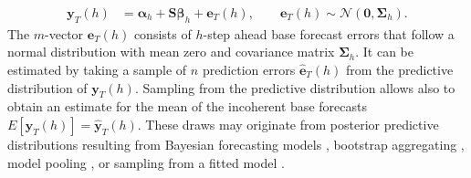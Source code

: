 \documentclass[a4paper,fleqn,11pt]{article}
\begin{document}
\begin{align}
\label{eq:meas1}
\mathbf{y}_{T}(h) &  = \boldsymbol{\alpha}_h + \textbf{S} \boldsymbol{\beta}_h + \mathbf{e}_{T}(h), \qquad \mathbf{e}_{T}(h) \sim \mathcal{N}(\textbf{0}, \boldsymbol{\Sigma}_h).
\end{align}
The $m$-vector $\mathbf{e}_{T}(h)$ consists of $h$-step ahead base forecast errors that follow a normal distribution with mean zero and covariance matrix $\boldsymbol{\Sigma}_h$. It can be estimated by taking a sample of $n$ prediction errors $\mathbf{\hat{e}}_{T}(h)$ from the predictive distribution of $\mathbf{y}_{T}(h) $. Sampling from the predictive distribution allows also to obtain an estimate for the mean of the incoherent base forecasts $E\left[\mathbf{y}_{T}(h)\right] = \mathbf{\hat{y}}_{T}(h)$.  These draws may originate from posterior predictive distributions resulting from Bayesian forecasting models \citep{Cesur2016}, bootstrap aggregating \citep{Bergmeir2016}, model pooling \citep{Timmermann2006,Kapetanios2015}, or sampling from a fitted model \citep{Hyndman2018}. 
\end{document}
